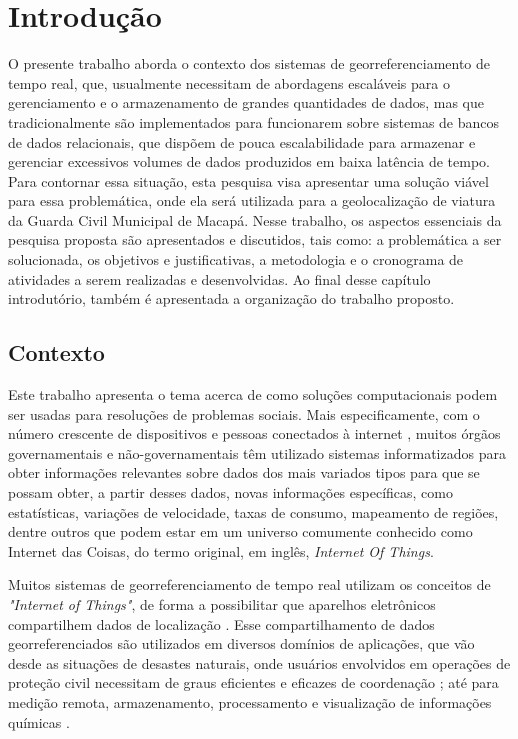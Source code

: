 %
%

\chapter{Introdução}\label{chap:introducao}  

O presente trabalho aborda o contexto dos sistemas de georreferenciamento de tempo real, que, usualmente necessitam de abordagens escaláveis para o gerenciamento e o armazenamento de grandes quantidades de dados, mas que tradicionalmente são implementados para funcionarem sobre sistemas de bancos de dados relacionais, que dispõem de pouca escalabilidade para armazenar e gerenciar excessivos volumes de dados produzidos em baixa latência de tempo. Para contornar essa situação, esta pesquisa visa apresentar uma solução viável para essa problemática, onde ela será utilizada para a geolocalização de viatura da Guarda Civil Municipal de Macapá. Nesse trabalho, os aspectos essenciais da pesquisa proposta são apresentados e discutidos, tais como: a problemática a ser solucionada, os objetivos e justificativas, a metodologia e o cronograma de atividades a serem realizadas e desenvolvidas. Ao final desse capítulo introdutório, também é apresentada a organização do trabalho proposto.

\section {Contexto}

Este trabalho apresenta o tema acerca de como soluções computacionais podem ser usadas para resoluções de problemas sociais. Mais especificamente, com o número crescente de dispositivos e pessoas conectados à internet \cite{IBGE-2018}, muitos órgãos governamentais e não-governamentais têm utilizado sistemas informatizados para obter informações relevantes sobre dados dos mais variados tipos para que se possam obter, a partir desses dados, novas informações específicas, como estatísticas, variações de velocidade, taxas de consumo, mapeamento de regiões, dentre outros que podem estar em um universo comumente conhecido como Internet das Coisas, do termo original, em inglês, \textit{Internet Of Things}\cite{Magrani-2018}.

Muitos sistemas de georreferenciamento de tempo real utilizam os conceitos de \textit{"Internet of Things"}, de forma a possibilitar que aparelhos eletrônicos compartilhem dados de localização \cite{Vega}. Esse compartilhamento de dados georreferenciados são utilizados em diversos domínios de aplicações, que vão desde as situações de desastes naturais, onde usuários envolvidos em operações de proteção civil necessitam de graus eficientes e eficazes de coordenação \cite{Barroso}; até para medição remota, armazenamento, processamento e visualização de informações químicas \cite{Vega}.

